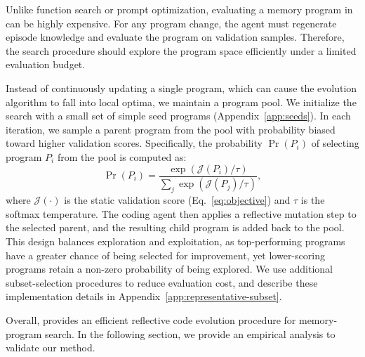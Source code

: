 Unlike function search or prompt optimization, evaluating a memory program in \sysname{} can be highly expensive.
For any program change, the agent must regenerate episode knowledge and evaluate the program on validation samples.
Therefore, the search procedure should explore the program space efficiently under a limited evaluation budget.

Instead of continuously updating a single program, which can cause the evolution algorithm to fall into local optima, we maintain a program pool.
We initialize the search with a small set of simple seed programs (Appendix~\ref{app:seeds}).
In each iteration, we sample a parent program from the pool with probability biased toward higher validation scores.
Specifically, the probability $\Pr(P_i)$ of selecting program $P_i$ from the pool is computed as:
\begin{equation}
    \Pr(P_i) = \frac{\exp(\mathcal{J}(P_i) / \tau)}{\sum_{j} \exp(\mathcal{J}(P_j) / \tau)},
\end{equation}
where $\mathcal{J}(\cdot)$ is the static validation score (Eq.~\ref{eq:objective}) and $\tau$ is the softmax temperature.
The coding agent then applies a reflective mutation step to the selected parent, and the resulting child program is added back to the pool.
This design balances exploration and exploitation, as top-performing programs have a greater chance of being selected for improvement, yet lower-scoring programs retain a non-zero probability of being explored.
We use additional subset-selection procedures to reduce evaluation cost, and describe these implementation details in Appendix~\ref{app:representative-subset}.

Overall, \sysname{} provides an efficient reflective code evolution procedure for memory-program search.
In the following section, we provide an empirical analysis to validate our method.


